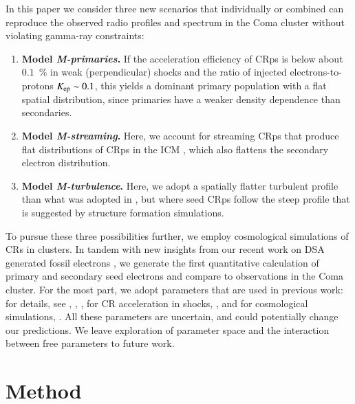 \documentclass[a4paper,fleqn,usenatbib]{mnras}
\begin{document}
In this paper we consider three new scenarios that
individually or combined can reproduce the observed radio profiles and
spectrum in the Coma cluster without violating gamma-ray constraints:
\begin{enumerate}
\item {\bf Model {\em M-primaries}.} If the acceleration efficiency of CRps is below
  about $0.1$~{\%} in weak (perpendicular) shocks and the ratio of injected
  electrons-to-protons $K_{{\mathrm{ep}}} \sim 0.1$, this yields a dominant primary
  population with a flat spatial distribution, since primaries have a weaker
  density dependence than secondaries.
\item {\bf Model {\em M-streaming}.} Here, we account for streaming CRps that
  produce flat distributions of CRps in the ICM
  \citep{ensslin11,wiener13,2014MNRAS.438..124Z}, which also flattens the
  secondary electron distribution.
\item {\bf Model {\em M-turbulence}.} Here, we adopt a spatially
  flatter turbulent profile than what was adopted in \citet{brunetti12},
  but where seed CRps follow the steep profile that is suggested by
  structure formation simulations.
\end{enumerate}

To pursue these three possibilities further, we employ cosmological
simulations of CRs in clusters. In tandem with new insights from our
recent work on DSA generated fossil electrons \citep{pinzke13}, we
generate the first quantitative calculation of primary and secondary
seed electrons and compare to observations in the Coma cluster. For
the most part, we adopt parameters that are used in previous work: for
details, see \citep[][ turbulent spectrum]{brunetti07,brunetti11},
\citep[][ injection scale of turbulens]{2015ApJ...800...60M},
\citep[][ energy density of
  turbulence]{2009ApJ...705.1129L,2010ApJ...725.1452S,2011A&A...529A..17V},
for CR acceleration in shocks, \citep[][ in particular $K_{\rmn{ep}}$,
  acceleration efficiency]{pinzke13}, and for cosmological
simulations, \citep[][ i.e., shock history, temperature profile,
  density profile, magnetic field profile]{pinzke10}. All these
parameters are uncertain, and could potentially change our
predictions. We leave exploration of parameter space and the
interaction between free parameters to future work.


\section{Method} 
\end{document}

